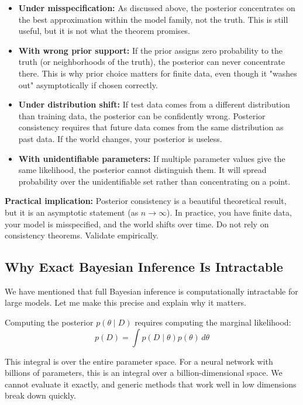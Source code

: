\begin{itemize}
\item \textbf{Under misspecification:} As discussed above, the posterior concentrates on the best approximation within the model family, not the truth. This is still useful, but it is not what the theorem promises.

\item \textbf{With wrong prior support:} If the prior assigns zero probability to the truth (or neighborhoods of the truth), the posterior can never concentrate there. This is why prior choice matters for finite data, even though it "washes out" asymptotically if chosen correctly.

\item \textbf{Under distribution shift:} If test data comes from a different distribution than training data, the posterior can be confidently wrong. Posterior consistency requires that future data comes from the same distribution as past data. If the world changes, your posterior is useless.

\item \textbf{With unidentifiable parameters:} If multiple parameter values give the same likelihood, the posterior cannot distinguish them. It will spread probability over the unidentifiable set rather than concentrating on a point.
\end{itemize}

\textbf{Practical implication:} Posterior consistency is a beautiful theoretical result, but it is an asymptotic statement (as $n \to \infty$). In practice, you have finite data, your model is misspecified, and the world shifts over time. Do not rely on consistency theorems. Validate empirically.

\subsection{Why Exact Bayesian Inference Is Intractable}

We have mentioned that full Bayesian inference is computationally intractable for large models. Let me make this precise and explain why it matters.

Computing the posterior $p(\theta \mid D)$ requires computing the marginal likelihood:
\begin{equation}
p(D) = \int p(D \mid \theta) p(\theta) \, d\theta
\end{equation}

This integral is over the entire parameter space. For a neural network with billions of parameters, this is an integral over a billion-dimensional space. We cannot evaluate it exactly, and generic methods that work well in low dimensions break down quickly.

